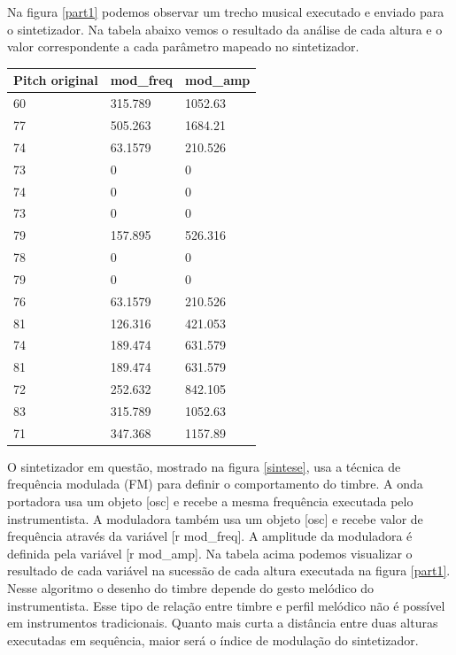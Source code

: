 \documentclass[draft]{ppgmus}
\begin{document}
Na figura \ref{part1} podemos observar um trecho musical executado e enviado para
o sintetizador. Na tabela abaixo vemos o resultado da análise de cada altura e o 
valor correspondente a cada parâmetro mapeado no sintetizador.

\pagebreak

\begin{center}
    \begin{tabular}{ | l | l | p{5cm} |}
    \hline
    Pitch original & mod\_freq & mod\_amp \\ \hline
    60 & 315.789 & 1052.63  \\ \hline
    77 & 505.263 & 1684.21  \\ \hline
     74 & 63.1579 & 210.526  \\ \hline
    73 & 0 & 0 \\ \hline
    74 & 0 & 0 \\ \hline
    73 & 0  & 0 \\ \hline
    79 & 157.895 & 526.316 \\ \hline
    78 &  0 & 0 \\ \hline
    79 & 0 & 0 \\ \hline
    76 & 63.1579 & 210.526 \\ \hline
    81 & 126.316 & 421.053 \\ \hline
    74 & 189.474 & 631.579 \\ \hline
   81 & 189.474 & 631.579 \\ \hline
   72 & 252.632 & 842.105 \\ \hline
  83 & 315.789 & 1052.63 \\ \hline
   71 & 347.368 & 1157.89 \\ \hline
    \hline
    \end{tabular}
\label{tabela-variaveis}
\end{center}


O sintetizador em questão, mostrado na figura \ref{sintese}, usa a técnica
de frequência modulada (FM) para definir o comportamento do timbre.
A onda portadora usa um objeto [osc\texttildelow] e recebe a mesma frequência executada pelo instrumentista.
A moduladora também usa um objeto [osc\texttildelow] e recebe valor de frequência através
da variável [r mod\_freq]. A amplitude da moduladora é definida pela variável [r mod\_amp].
Na tabela acima podemos visualizar o resultado de cada variável na sucessão de cada altura executada
na figura \ref{part1}. Nesse algoritmo o desenho do timbre depende do gesto melódico do instrumentista.
Esse tipo de relação entre timbre e perfil melódico não é possível em instrumentos tradicionais.
Quanto mais curta a distância entre duas alturas executadas em sequência, maior será o índice de 
modulação do sintetizador.
\end{document}
